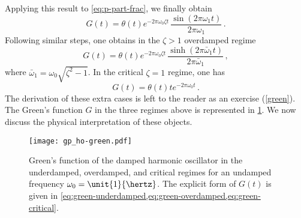 Applying this result to \cref{eq:p-part-frac}, we finally obtain
\begin{equation}
  \boxed{G(t)
  =\theta(t)e^{-2\pi\omega_0\zeta t}\,\frac{\sin(2\pi\omega_1t)}{2\pi\omega_1}}\,.
  \label{eq:green-underdamped}
\end{equation}
Following similar steps, one obtains in the $\zeta>1$ overdamped regime
\begin{equation}
  \boxed{
    G(t)=\theta(t)e^{-2\pi\omega_0\zeta t}\,
  \frac{\sinh(2\pi\bar{\omega}_1t)}{2\pi\bar{\omega}_1}}\,,
  \label{eq:green-overdamped}
\end{equation}
where $\bar{\omega}_1=\omega_0\sqrt{\zeta^2-1}$. In the critical $\zeta=1$ regime, one has
\begin{equation}
  \boxed{G(t)=\theta(t)te^{-2\pi\omega_0 t}}\,.
  \label{eq:green-critical}
\end{equation}
The derivation of these extra cases is left to the reader as an exercise
(\cf\cref{green}). The Green's function $G$ in the three regimes above is represented in
\cref{fig:ho-green}. We now discuss the physical interpretation of these objects.
\begin{figure}[t]
  \centering
  \texttt{[image: gp\_ho-green.pdf]}
  \caption{Green's function of the damped harmonic oscillator in the underdamped,
    overdamped, and critical regimes for an undamped frequency $\omega_0=\unit{1}{\hertz}$.
    The explicit form of $G(t)$ is given in
  \cref{eq:green-underdamped,eq:green-overdamped,eq:green-critical}.}
  \label{fig:ho-green}
\end{figure}
